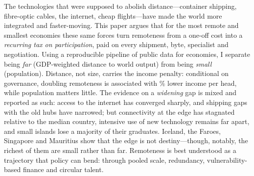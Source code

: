 The technologies that were supposed to abolish distance---container shipping,
fibre-optic cables, the internet, cheap flights---have made the world more
integrated and faster-moving. This paper argues that for the most remote and
smallest economies these same forces turn remoteness from a one-off cost into
a \emph{recurring tax on participation}, paid on every shipment, byte,
specialist and negotiation. Using a reproducible pipeline of public data for
\nCountriesRemote{} economies, I separate being \emph{far} (GDP-weighted
distance to world output) from being \emph{small} (population). Distance, not
size, carries the income penalty: conditional on governance, doubling
remoteness is associated with \regDoubleRemotePctAbs\% lower income per head,
while population matters little. The evidence on a \emph{widening} gap is
mixed and reported as such: access to the internet has converged sharply,
and shipping gaps with the old hubs have narrowed; but connectivity at the
edge has stagnated relative to the median country, intensive use of new
technology remains far apart, and small islands lose a majority of their
graduates. Iceland, the Faroes, Singapore and Mauritius show that the edge is
not destiny---though, notably, the richest of them are small rather than
far. Remoteness is best understood as a trajectory that policy can bend:
through pooled scale, redundancy, vulnerability-based finance and circular
talent.
